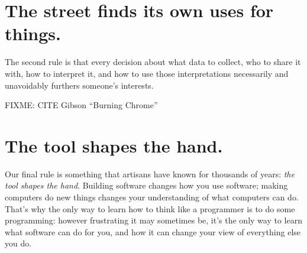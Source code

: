 \documentclass[10pt,letterpaper]{article}
\newcommand{\rulemajor}[1]{\section{#1}}
\begin{document}
\rulemajor{The street finds its own uses for things.}

The second rule is that every decision about what data to collect, who to share
it with, how to interpret it, and how to use those interpretations necessarily
and unavoidably furthers someone's interests.

FIXME: CITE Gibson ``Burning Chrome'' \cite{Gibs1987}

\rulemajor{The tool shapes the hand.}

Our final rule is something that artisans have known for thousands of years:
\emph{the tool shapes the hand}.  Building software changes how you use
software; making computers do new things changes your understanding of what
computers can do.  That's why the only way to learn how to think like a
programmer is to do some programming: however frustrating it may sometimes be,
it's the only way to learn what software can do for you, and how it can change
your view of everything else you do.


\end{document}
